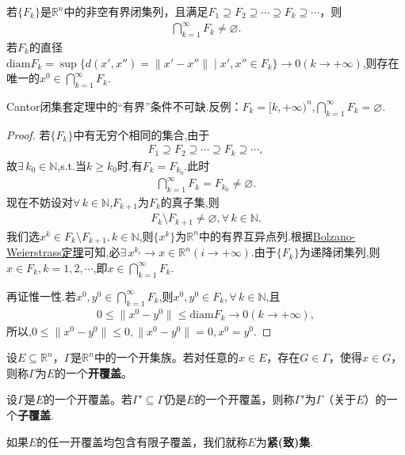 \documentclass[../../main.tex]{subfiles}%
\begin{document}
\begin{theorem}[Cantor闭集套定理]\label{theorem:实变函数--Cantor闭集套定理}
若\(\{F_k\}\)是\(\mathbb{R}^n\)中的非空有界闭集列，且满足\(F_1\supseteq F_2\supseteq\cdots\supseteq F_k\supseteq\cdots\)，则
\begin{align*}
\bigcap_{k = 1}^{\infty}F_k\neq\varnothing.
\end{align*}
若$F_k$的直径$\mathrm{diam}F_k=\sup\{d(x',x'')=\|x'-x''\|\mid x',x''\in F_k\}\to0(k\to+\infty)$,则存在唯一的$ x^0\in\bigcap\limits_{k=1}^{\infty}F_k$.
\end{theorem}
\begin{remark}
Cantor闭集套定理中的“有界”条件不可缺.反例：$F_k=[k,+\infty)^n$,$\bigcap\limits_{k=1}^{\infty}F_k=\varnothing$.
\end{remark}
\begin{proof}
若$\{F_k\}$中有无穷个相同的集合,由于
\begin{align*}
F_1\supseteq F_2\supseteq\cdots\supseteq F_k\supseteq\cdots,
\end{align*}
故$\exists\,k_0\in\mathbb{N}$,s.t.当$k\geqslant k_0$时,有$F_k=F_{k_0}$.此时
\begin{align*}
\bigcap\limits_{k=1}^{\infty}F_k=F_{k_0}\neq\varnothing.
\end{align*}
现在不妨设对$\forall\,k\in\mathbb{N}$,$F_{k+1}$为$F_k$的真子集,则
\begin{align*}
F_k\setminus F_{k+1}\neq\varnothing,\forall\,k\in\mathbb{N}.
\end{align*}
我们选$x^k\in F_k\setminus F_{k+1},k\in\mathbb{N}$,则$\{x^k\}$为$\mathbb{R}^n$中的有界互异点列.根据\hyperref[theorem:R^n中的Bolzano--Weierstrass定理]{Bolzano-Weierstrass定理}可知,必$\exists\,x^{k_i}\to x\in\mathbb{R}^n(i\to+\infty)$.由于$\{F_k\}$为递降闭集列,则$x\in F_k,k=1,2,\cdots$,即$x\in\bigcap\limits_{k=1}^{\infty}F_k$.

再证惟一性.若$x^0,y^0\in\bigcap\limits_{k=1}^{\infty}F_k$,则$x^0,y^0\in F_k,\forall\,k\in\mathbb{N}$,且
\begin{align*}
0\leqslant\|x^0-y^0\|\leqslant\mathrm{diam}F_k\to0(k\to+\infty),
\end{align*}
所以,$0\leqslant\|x^0-y^0\|\leqslant0,\|x^0-y^0\|=0,x^0=y^0$.
\end{proof}

\begin{definition}
设\(E\subseteq\mathbb{R}^n\)，\(\Gamma\)是\(\mathbb{R}^n\)中的一个开集族。若对任意的\(x\in E\)，存在\(G\in\Gamma\)，使得\(x\in G\)，则称\(\Gamma\)为\(E\)的一个\textbf{开覆盖}。

设\(\Gamma\)是\(E\)的一个开覆盖。若\(\Gamma'\subseteq\Gamma\)仍是\(E\)的一个开覆盖，则称\(\Gamma'\)为\(\Gamma\)（关于\(E\)）的一个\textbf{子覆盖}.

如果\(E\)的任一开覆盖均包含有限子覆盖，我们就称\(E\)为\textbf{紧(致)集}.
\end{definition}
\end{document}
